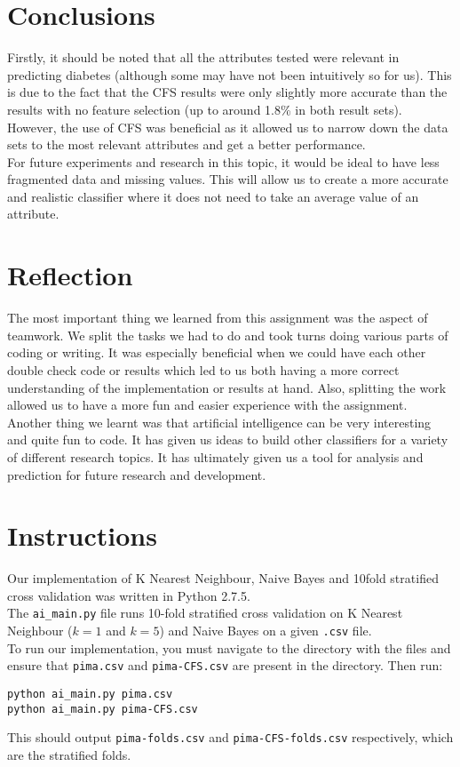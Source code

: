\documentclass{article}
\renewcommand{\tt}{\texttt}
\begin{document}
\section{Conclusions}
Firstly, it should be noted that all the attributes tested were relevant in predicting diabetes (although some may have not been intuitively so for us). This is due to the fact that the CFS results were only slightly more accurate than the results with no feature selection (up to around 1.8\% in both result sets). However, the use of CFS was beneficial as it allowed us to narrow down the data sets to the most relevant attributes and get a better performance.  \\

For future experiments and research in this topic, it would be ideal to have less fragmented data and missing values. This will allow us to create a more accurate and realistic classifier where it does not need to take an average value of an attribute. 

\section{Reflection}
The most important thing we learned from this assignment was the aspect of teamwork. We split the tasks we had to do and took turns doing various parts of coding or writing. It was especially beneficial when we could have each other double check code or results which led to us both having a more correct understanding of the implementation or results at hand. Also, splitting the work allowed us to have a more fun and easier experience with the assignment. \\

Another thing we learnt was that artificial intelligence can be very interesting and quite fun to code. It has given us ideas to build other classifiers for a variety of different research topics. It has ultimately given us a tool for analysis and prediction for future research and development.

\section{Instructions}
Our implementation of K Nearest Neighbour, Naive Bayes and 10\-fold stratified cross validation was written in Python 2.7.5.\\

The \tt{ai\_main.py} file runs 10-fold stratified cross validation on K Nearest Neighbour ($k=1$ and $k=5$) and Naive Bayes on a given \tt{.csv} file.\\

To run our implementation, you must navigate to the directory with the files and ensure that \tt{pima.csv} and \tt{pima-CFS.csv} are present in the directory. Then run:
\begin{lstlisting}
python ai_main.py pima.csv
python ai_main.py pima-CFS.csv
\end{lstlisting}

This should output \tt{pima-folds.csv} and \tt{pima-CFS-folds.csv} respectively, which are the stratified folds.
\end{document}
